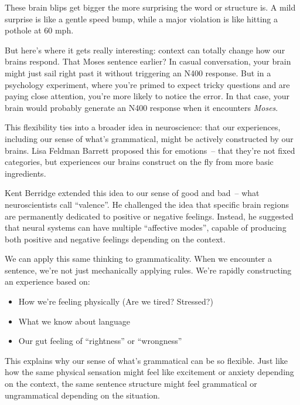 These brain blips get bigger the more surprising the word or structure is. A mild surprise is like a gentle speed bump, while a major violation is like hitting a pothole at 60 mph.

But here's where it gets really interesting: context can totally change how our brains respond. That Moses sentence earlier? In casual conversation, your brain might just sail right past it without triggering an N400 response. But in a psychology experiment, where you're primed to expect tricky questions and are paying close attention, you're more likely to notice the error. In that case, your brain would probably generate an N400 response when it encounters \textit{Moses}.

This flexibility ties into a broader idea in neuroscience: that our experiences, including our sense of what's grammatical, might be actively constructed by our brains. Lisa Feldman Barrett proposed this for emotions~-- that they're not fixed categories, but experiences our brains construct on the fly from more basic ingredients.

Kent Berridge extended this idea to our sense of good and bad~-- what neuroscientists call ``valence''. He challenged the idea that specific brain regions are permanently dedicated to positive or negative feelings. Instead, he suggested that neural systems can have multiple ``affective modes'', capable of producing both positive and negative feelings depending on the context.

We can apply this same thinking to grammaticality. When we encounter a sentence, we're not just mechanically applying rules. We're rapidly constructing an experience based on:

\begin{itemize}
    \item How we're feeling physically (Are we tired? Stressed?)
    \item What we know about language
    \item Our gut feeling of ``rightness'' or ``wrongness''
\end{itemize}

This explains why our sense of what's grammatical can be so flexible. Just like how the same physical sensation might feel like excitement or anxiety depending on the context, the same sentence structure might feel grammatical or ungrammatical depending on the situation.

